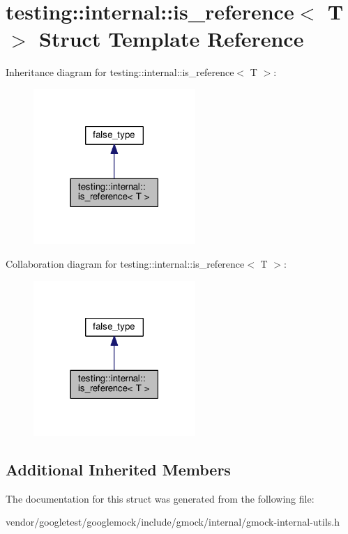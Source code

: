 \hypertarget{structtesting_1_1internal_1_1is__reference}{}\section{testing\+:\+:internal\+:\+:is\+\_\+reference$<$ T $>$ Struct Template Reference}
\label{structtesting_1_1internal_1_1is__reference}


Inheritance diagram for testing\+:\+:internal\+:\+:is\+\_\+reference$<$ T $>$\+:\nopagebreak
\begin{figure}[H]
\begin{center}
\leavevmode
\includegraphics[width=174pt]{structtesting_1_1internal_1_1is__reference__inherit__graph}
\end{center}
\end{figure}


Collaboration diagram for testing\+:\+:internal\+:\+:is\+\_\+reference$<$ T $>$\+:\nopagebreak
\begin{figure}[H]
\begin{center}
\leavevmode
\includegraphics[width=174pt]{structtesting_1_1internal_1_1is__reference__coll__graph}
\end{center}
\end{figure}
\subsection*{Additional Inherited Members}


The documentation for this struct was generated from the following file\+:\begin{DoxyCompactItemize}
\item 
vendor/googletest/googlemock/include/gmock/internal/gmock-\/internal-\/utils.\+h\end{DoxyCompactItemize}
